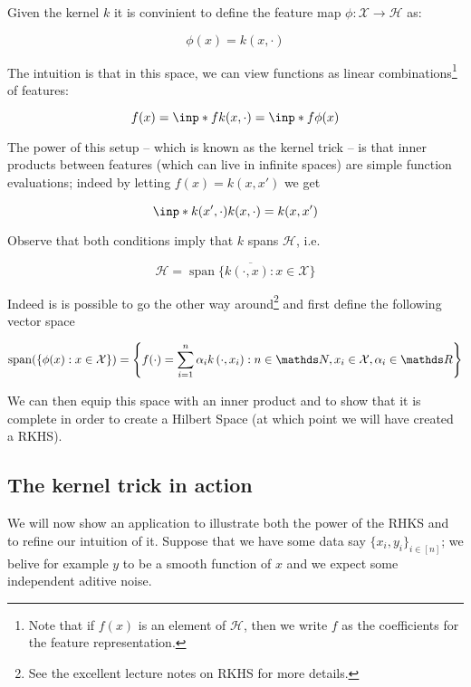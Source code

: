 Given the kernel $k$ it is convinient to define the feature map $\phi: \mathcal{X} \rightarrow \mathcal{H}$ as:

$$
    \phi(x) = k(x, \cdot)
$$

The intuition is that in this space, we can view functions as linear combinations\footnote{
    Note that if $f(x)$ is an element of $\mathcal{H}$, then we write $f$ as the coefficients
    for the feature representation. 
} of features:

$$
    f(x) =  \inp*{f}{k(x, \cdot)} = \inp*{f}{\phi(x)}
$$


The power of this setup -- which is known as the kernel trick -- is that inner products between
features (which can live in infinite spaces) are simple function evaluations; 
indeed by letting $f(x) = k(x, x\prime)$ we get

$$
    \inp*{k(x^\prime, \cdot)}{k(x, \cdot)} = k(x, x^\prime)
$$

Observe that both conditions imply that $k$ spans $\mathcal{H}$, i.e.

\begin{equation}
    \mathcal{H}=\overline{\operatorname{span}\{k(\cdot, x): x \in \mathcal{X}\}}
\end{equation}

Indeed is is possible to go the other way around\footnote{See the excellent lecture notes on 
RKHS \cite{BartlettNotes} for more details.} and first define the following vector space

\begin{equation}
    \operatorname{span}(\{\phi(x): x \in \mathcal{X}\})=\left\{f(\cdot)=
    \sum_{i=1}^{n} \alpha_{i} k\left(\cdot, x_{i}\right): n \in \N, x_{i} 
    \in \mathcal{X}, \alpha_{i} \in \R\right\}
\end{equation}

We can then equip this space with an inner product and to show that it is complete in order to create
a Hilbert Space (at which point we will have created a RKHS). 

\subsection{The kernel trick in action}

We will now show an application to illustrate both the power of the RHKS and to refine our intuition of it. 
Suppose that we have 
some data say $\{ x_i, y_i\}_{i \in [n]}$; we belive for example $y$ to be a smooth function of $x$ and we 
expect some independent aditive noise.

